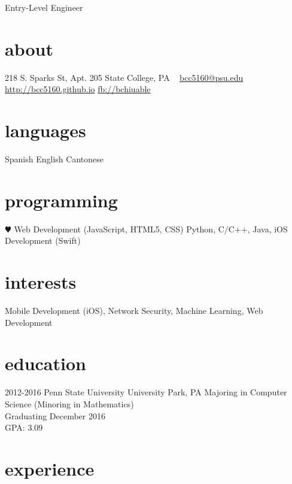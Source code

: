 \documentclass[]{friggeri-cv}
\begin{document}
       {Entry-Level Engineer}


\begin{aside}
  \section{about}
    218 S. Sparks St,
    Apt. 205
    State College, PA
    ~
    \href{mailto:bcc5160@psu.edu}{bcc5160@psu.edu}
    \href{http://bcc5160.github.io}{http://bcc5160.github.io}
    \href{http://facebook.com/bchiuable}{fb://bchiuable}
  \section{languages}
    Spanish  
    English 
    Cantonese
  \section{programming}
    {\color{red} $\varheartsuit$} Web Development (JavaScript, HTML5, CSS)
    Python, C/C++, Java,
    iOS Development (Swift)
    \end{aside}

\section{interests}

Mobile Development (iOS), Network Security, Machine Learning, Web Development

\section{education}

\begin{entrylist}
    \entry
    {2012-2016}
    {Penn State University}
    {University Park, PA}
    {Majoring in Computer Science (Minoring in Mathematics) \\
    Graduating December 2016 \\
    GPA: 3.09}
\end{entrylist}

\section{experience}
\end{document}
